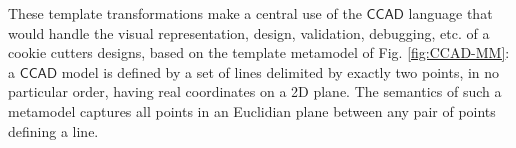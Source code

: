 These template transformations make a central use of the $\mathsf{CCAD}$ 
language that would handle the visual representation, design, validation, 
debugging, etc. of a cookie cutters designs, based on the template metamodel 
of Fig. \ref{fig:CCAD-MM}: a $\mathsf{CCAD}$ model is defined by a set 
of lines delimited by exactly two points, in no particular order, having real 
coordinates on a 2D plane. The semantics of such a metamodel captures all points 
in an Euclidian plane between any pair of points defining a line.




